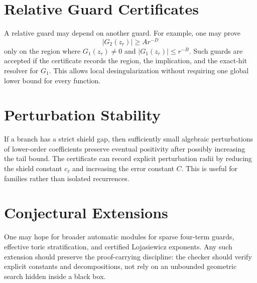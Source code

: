 \documentclass[11pt]{article}
\begin{document}
\appendix

\section{Relative Guard Certificates}

A relative guard may depend on another guard. For example, one may prove
\[
|G_2(z_r)|\ge A r^{-D}
\]
only on the region where \(G_1(z_r)\neq0\) and \(|G_1(z_r)|\le r^{-B}\). Such guards are accepted if the certificate records the region, the implication, and the exact-hit resolver for \(G_1\). This allows local desingularization without requiring one global lower bound for every function.

\section{Perturbation Stability}

If a branch has a strict shield gap, then sufficiently small algebraic perturbations of lower-order coefficients preserve eventual positivity after possibly increasing the tail bound. The certificate can record explicit perturbation radii by reducing the shield constant \(c_\ell\) and increasing the error constant \(C\). This is useful for families rather than isolated recurrences.

\section{Conjectural Extensions}

One may hope for broader automatic modules for sparse four-term guards, effective toric stratification, and certified Lojasiewicz exponents. Any such extension should preserve the proof-carrying discipline: the checker should verify explicit constants and decompositions, not rely on an unbounded geometric search hidden inside a black box.
\end{document}
